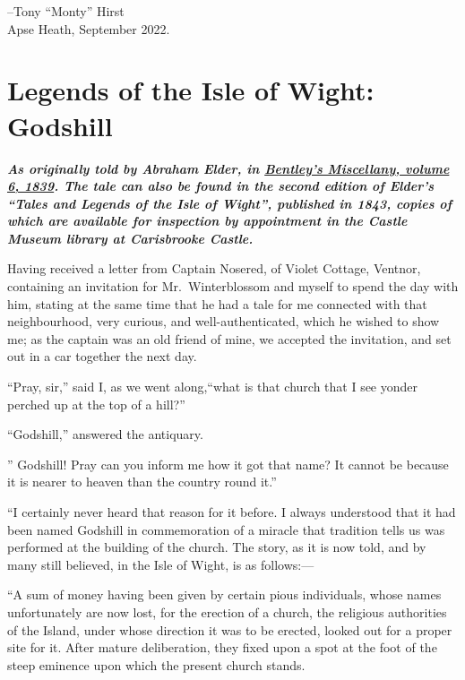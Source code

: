 \documentclass[
  12pt,
  a5paper,
  twoside]{book}
\begin{document}
--Tony ``Monty'' Hirst\\
Apse Heath, September 2022.

\let\thefootnote\relax{}


\chapter{Legends of the Isle of Wight:
Godshill}\label{legends-of-the-isle-of-wight-godshill}

\textbf{\emph{As originally told by Abraham Elder, in
\href{https://archive.org/details/sim_bentleys-miscellany_1839-07_6/page/255/mode/1up?q=godshill}{\emph{Bentley's
Miscellany}, volume 6, 1839}. The tale can also be found in the second
edition of Elder's ``Tales and Legends of the Isle of Wight'', published
in 1843, copies of which are available for inspection by appointment in
the Castle Museum library at Carisbrooke Castle.}}

Having received a letter from Captain Nosered, of Violet Cottage,
Ventnor, containing an invitation for Mr.~Winterblossom and myself to
spend the day with him, stating at the same time that he had a tale for
me connected with that neighbourhood, very curious, and
well-authenticated, which he wished to show me; as the captain was an
old friend of mine, we accepted the invitation, and set out in a car
together the next day.

``Pray, sir,'' said I, as we went along,``what is that church that I see
yonder perched up at the top of a hill?''

``Godshill,'' answered the antiquary.

'' Godshill! Pray can you inform me how it got that name? It cannot be
because it is nearer to heaven than the country round it.''

``I certainly never heard that reason for it before. I always understood
that it had been named Godshill in commemoration of a miracle that
tradition tells us was performed at the building of the church. The
story, as it is now told, and by many still believed, in the Isle of
Wight, is as follows:---

``A sum of money having been given by certain pious individuals, whose
names unfortunately are now lost, for the erection of a church, the
religious authorities of the Island, under whose direction it was to be
erected, looked out for a proper site for it. After mature deliberation,
they fixed upon a spot at the foot of the steep eminence upon which the
present church stands.
\end{document}
